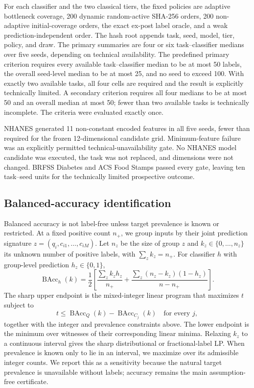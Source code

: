 \documentclass[referee,lineno,pdflatex,sn-nature]{sn-jnl}
\theoremstyle{thmstyleone}%
\theoremstyle{thmstyletwo}%
\theoremstyle{thmstylethree}%
\begin{document}
For each classifier and the two classical tiers, the fixed policies are adaptive bottleneck coverage, 200 dynamic random-active SHA-256 orders, 200 non-adaptive initial-coverage orders, the exact ex-post label oracle, and a weak prediction-independent order. The hash root appends task, seed, model, tier, policy, and draw. The primary summaries are four or six task--classifier medians over five seeds, depending on technical availability. The predefined primary criterion requires every available task--classifier median to be at most 50 labels, the overall seed-level median to be at most 25, and no seed to exceed 100. With exactly two available tasks, all four cells are required and the result is explicitly technically limited. A secondary criterion requires all four medians to be at most 50 and an overall median at most 50; fewer than two available tasks is technically incomplete. The criteria were evaluated exactly once.

NHANES generated 11 non-constant encoded features in all five seeds, fewer than required for the frozen 12-dimensional candidate grid. Minimum-feature failure was an explicitly permitted technical-unavailability gate. No NHANES model candidate was executed, the task was not replaced, and dimensions were not changed. BRFSS Diabetes and ACS Food Stamps passed every gate, leaving ten task--seed units for the technically limited prospective outcome.

\subsection{Balanced-accuracy identification}
\label{sec:methods_bacc}

Balanced accuracy is not label-free unless target prevalence is known or restricted. At a fixed positive count $n_+$, we group inputs by their joint prediction signature $z=(q_i,c_{i1},\ldots,c_{iM})$. Let $n_z$ be the size of group $z$ and $k_z\in\{0,\ldots,n_z\}$ its unknown number of positive labels, with $\sum_zk_z=n_+$. For classifier $h$ with group-level prediction $h_z\in\{0,1\}$,
\[
\operatorname{BAcc}_h(k)=\frac12\left[
\frac{\sum_z k_z h_z}{n_+}+
\frac{\sum_z(n_z-k_z)(1-h_z)}{n-n_+}
\right].
\]
The sharp upper endpoint is the mixed-integer linear program that maximizes $t$ subject to
\[
t\leq\operatorname{BAcc}_Q(k)-\operatorname{BAcc}_{C_j}(k)
\quad\text{for every }j,
\]
together with the integer and prevalence constraints above. The lower endpoint is the minimum over witnesses of their corresponding linear minima. Relaxing $k_z$ to a continuous interval gives the sharp distributional or fractional-label LP. When prevalence is known only to lie in an interval, we maximize over its admissible integer counts. We report this as a sensitivity because the natural target prevalence is unavailable without labels; accuracy remains the main assumption-free certificate.
\end{document}
